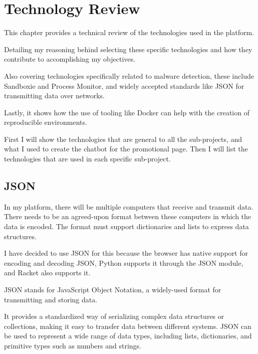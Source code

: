 \chapter{Technology Review}

This chapter provides a technical review of the technologies used in the platform.

Detailing my reasoning behind selecting these specific technologies
and how they contribute to accomplishing my objectives.

Also covering technologies specifically related to malware detection,
these include Sandboxie and Process Monitor,
and widely accepted standards like JSON for transmitting data over networks.

Lastly, it shows how the use of tooling like Docker
can help with the creation of reproducible environments.

First I will show the technologies that are general to all the sub-projects,
and what I used to create the chatbot for the promotional page.
Then I will list the technologies that are used in each specific sub-project.

\section{JSON}
In my platform, there will be multiple computers that receive and transmit data.
There needs to be an agreed-upon format between these
computers in which the data is encoded.
The format must support dictionaries and lists to express data structures.

I have decided to use JSON for this because the browser has
native support for encoding and decoding JSON,
Python supports it through the JSON module, and Racket also supports it.

JSON stands for JavaScript Object Notation,
a widely-used format for transmitting and storing data.

It provides a standardized way of serializing complex data structures or collections,
making it easy to transfer data between different systems.
JSON can be used to represent a wide range of data types,
including lists, dictionaries, and primitive types such as numbers and strings. \cite{ECMA-404}

